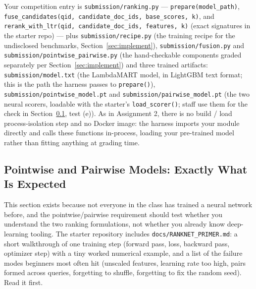 \documentclass[10pt]{article}
\begin{document}
Your competition entry is \texttt{submission/ranking.py} — \texttt{prepare(model\_path)}, \texttt{fuse\_candidates(qid, candidate\_doc\_ids, base\_scores, k)}, and \texttt{rerank\_with\_ltr(qid, candidate\_doc\_ids, features, k)} (exact signatures in the starter repo) — plus \texttt{submission/recipe.py} (the training recipe for the undisclosed benchmarks, Section~\ref{sec:implement}), \texttt{submission/fusion.py} and \texttt{submission/pointwise\_pairwise.py} (the hand-checkable components graded separately per Section~\ref{sec:implement}) and three trained artifacts: \texttt{submission/model.txt} (the LambdaMART model, in LightGBM text format; this is the path the harness passes to \texttt{prepare()}), \texttt{submission/pointwise\_model.pt} and \texttt{submission/pairwise\_model.pt} (the two neural scorers, loadable with the starter's \texttt{load\_scorer()}; staff use them for the check in Section~\ref{sec:pointwise-pairwise}, test (e)). As in Assignment 2, there is no build / load process-isolation step and no Docker image: the harness imports your module directly and calls these functions in-process, loading your pre-trained model rather than fitting anything at grading time.

\subsection{Pointwise and Pairwise Models: Exactly What Is Expected}
\label{sec:pointwise-pairwise}

This section exists because not everyone in the class has trained a neural network before, and the pointwise/pairwise requirement should test whether you understand the two ranking formulations, not whether you already know deep-learning tooling. The starter repository includes \texttt{docs/RANKNET\_PRIMER.md}: a short walkthrough of one training step (forward pass, loss, backward pass, optimizer step) with a tiny worked numerical example, and a list of the failure modes beginners most often hit (unscaled features, learning rate too high, pairs formed across queries, forgetting to shuffle, forgetting to fix the random seed). Read it first.
\end{document}
